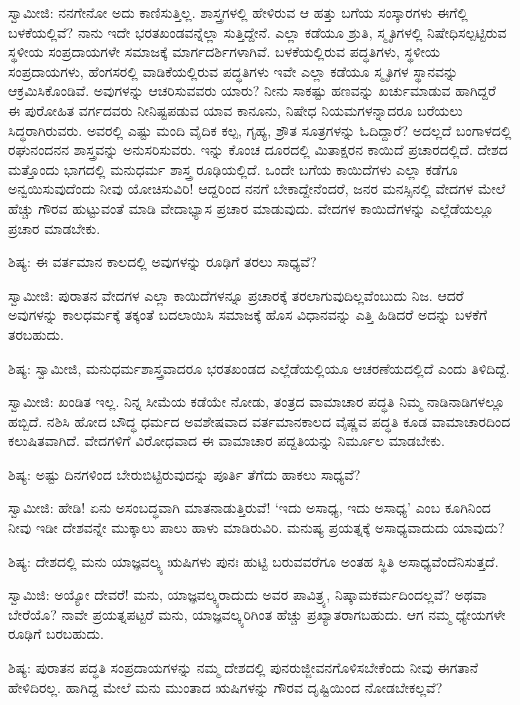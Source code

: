 ಸ್ವಾಮೀಜಿ: ನನಗೇನೋ ಅದು ಕಾಣಿಸುತ್ತಿಲ್ಲ. ಶಾಸ್ತ್ರಗಳಲ್ಲಿ ಹೇಳಿರುವ ಆ ಹತ್ತು ಬಗೆಯ ಸಂಸ್ಕಾರಗಳು ಈಗೆಲ್ಲಿ ಬಳಕೆಯಲ್ಲಿವೆ? ನಾನು ಇದೇ ಭರತಖಂಡವನ್ನೆಲ್ಲಾ ಸುತ್ತಿದ್ದೇನೆ. ಎಲ್ಲಾ ಕಡೆಯೂ ಶ್ರುತಿ, ಸ್ಮೃತಿಗಳಲ್ಲಿ ನಿಷೇಧಿಸಲ್ಪಟ್ಟಿರುವ ಸ್ಥಳೀಯ ಸಂಪ್ರದಾಯಗಳೇ ಸಮಾಜಕ್ಕೆ ಮಾರ್ಗದರ್ಶಿಗಳಾಗಿವೆ. ಬಳಕೆಯಲ್ಲಿರುವ ಪದ್ಧತಿಗಳು, ಸ್ಥಳೀಯ ಸಂಪ್ರದಾಯಗಳು, ಹೆಂಗಸರಲ್ಲಿ ವಾಡಿಕೆಯಲ್ಲಿರುವ ಪದ್ಧತಿಗಳು ಇವೇ ಎಲ್ಲಾ ಕಡೆಯೂ ಸ್ಮೃತಿಗಳ ಸ್ಥಾನವನ್ನು ಆಕ್ರಮಿಸಿಕೊಂಡಿವೆ. ಅವುಗಳನ್ನು ಆಚರಿಸುವವರು ಯಾರು? ನೀನು ಸಾಕಷ್ಟು ಹಣವನ್ನು ಖರ್ಚುಮಾಡುವ ಹಾಗಿದ್ದರೆ ಈ ಪುರೋಹಿತ ವರ್ಗದವರು ನೀನಿಷ್ಟಪಡುವ ಯಾವ ಕಾನೂನು, ನಿಷೇಧ ನಿಯಮಗಳನ್ನಾದರೂ ಬರೆಯಲು ಸಿದ್ಧರಾಗಿರುವರು. ಅವರಲ್ಲಿ ಎಷ್ಟು ಮಂದಿ ವೈದಿಕ ಕಲ್ಪ, ಗೃಹ್ಯ, ಶ್ರೌತ ಸೂತ್ರಗಳನ್ನು ಓದಿದ್ದಾರೆ? ಅದಲ್ಲದೆ ಬಂಗಾಳದಲ್ಲಿ ರಘುನಂದನನ ಶಾಸ್ತ್ರವನ್ನು ಅನುಸರಿಸುವರು. ಇನ್ನು ಕೊಂಚ ದೂರದಲ್ಲಿ ಮಿತಾಕ್ಷರನ ಕಾಯಿದೆ ಪ್ರಚಾರದಲ್ಲಿದೆ. ದೇಶದ ಮತ್ತೊಂದು ಭಾಗದಲ್ಲಿ ಮನುಧರ್ಮ ಶಾಸ್ತ್ರ ರೂಢಿಯಲ್ಲಿದೆ. ಒಂದೇ ಬಗೆಯ ಕಾಯಿದೆಗಳು ಎಲ್ಲಾ ಕಡೆಗೂ ಅನ್ವಯಿಸುವುದೆಂದು ನೀವು ಯೋಚಿಸುವಿರಿ! ಆದ್ದರಿಂದ ನನಗೆ ಬೇಕಾದ್ದೇನೆಂದರೆ, ಜನರ ಮನಸ್ಸಿನಲ್ಲಿ ವೇದಗಳ ಮೇಲೆ ಹೆಚ್ಚು ಗೌರವ ಹುಟ್ಟುವಂತೆ ಮಾಡಿ ವೇದಾಭ್ಯಾಸ ಪ್ರಚಾರ ಮಾಡುವುದು. ವೇದಗಳ ಕಾಯಿದೆಗಳನ್ನು ಎಲ್ಲೆಡೆಯಲ್ಲೂ ಪ್ರಚಾರ ಮಾಡಬೇಕು.

ಶಿಷ್ಯ: ಈ ವರ್ತಮಾನ ಕಾಲದಲ್ಲಿ ಅವುಗಳನ್ನು ರೂಢಿಗೆ ತರಲು ಸಾಧ್ಯವೆ?

ಸ್ವಾಮೀಜಿ: ಪುರಾತನ ವೇದಗಳ ಎಲ್ಲಾ ಕಾಯಿದೆಗಳನ್ನೂ ಪ್ರಚಾರಕ್ಕೆ ತರಲಾಗುವುದಿಲ್ಲವೆಂಬುದು ನಿಜ. ಆದರೆ ಅವುಗಳನ್ನು ಕಾಲಧರ್ಮಕ್ಕೆ ತಕ್ಕಂತೆ ಬದಲಾಯಿಸಿ ಸಮಾಜಕ್ಕೆ ಹೊಸ ವಿಧಾನವನ್ನು ಎತ್ತಿ ಹಿಡಿದರೆ ಅದನ್ನು ಬಳಕೆಗೆ ತರಬಹುದು.

ಶಿಷ್ಯ: ಸ್ವಾಮೀಜಿ, ಮನುಧರ್ಮಶಾಸ್ತ್ರವಾದರೂ ಭರತಖಂಡದ ಎಲ್ಲೆಡೆಯಲ್ಲಿಯೂ ಆಚರಣೆಯದಲ್ಲಿದೆ ಎಂದು ತಿಳಿದಿದ್ದೆ.

ಸ್ವಾಮೀಜಿ: ಖಂಡಿತ ಇಲ್ಲ. ನಿನ್ನ ಸೀಮೆಯ ಕಡೆಯೇ ನೋಡು, ತಂತ್ರದ ವಾಮಾಚಾರ ಪದ್ಧತಿ ನಿಮ್ಮ ನಾಡಿನಾಡಿಗಳಲ್ಲೂ ಹಬ್ಬಿದೆ. ನಶಿಸಿ ಹೋದ ಬೌದ್ಧ ಧರ್ಮದ ಅವಶೇಷವಾದ ವರ್ತಮಾನಕಾಲದ ವೈಷ್ಣವ ಪದ್ಧತಿ ಕೂಡ ವಾಮಾಚಾರದಿಂದ ಕಲುಷಿತವಾಗಿದೆ. ವೇದಗಳಿಗೆ ವಿರೋಧವಾದ ಈ ವಾಮಾಚಾರ ಪದ್ದತಿಯನ್ನು ನಿರ್ಮೂಲ ಮಾಡಬೇಕು.

ಶಿಷ್ಯ: ಅಷ್ಟು ದಿನಗಳಿಂದ ಬೇರುಬಿಟ್ಟಿರುವುದನ್ನು ಪೂರ್ತಿ ತೆಗೆದು ಹಾಕಲು ಸಾಧ್ಯವೆ?

ಸ್ವಾಮೀಜಿ: ಹೇಡಿ! ಏನು ಅಸಂಬದ್ಧವಾಗಿ ಮಾತನಾಡುತ್ತಿರುವೆ! ‘ಇದು ಅಸಾಧ್ಯ, ಇದು ಅಸಾಧ್ಯ’ ಎಂಬ ಕೂಗಿನಿಂದ ನೀವು ಇಡೀ ದೇಶವನ್ನೇ ಮುಕ್ಕಾಲು ಪಾಲು ಹಾಳು ಮಾಡಿರುವಿರಿ. ಮನುಷ್ಯ ಪ್ರಯತ್ನಕ್ಕೆ ಅಸಾಧ್ಯವಾದುದು ಯಾವುದು?

ಶಿಷ್ಯ: ದೇಶದಲ್ಲಿ ಮನು ಯಾಜ್ಞವಲ್ಕ್ಯ ಋಷಿಗಳು ಪುನಃ ಹುಟ್ಟಿ ಬರುವವರೆಗೂ ಅಂತಹ ಸ್ಥಿತಿ ಅಸಾಧ್ಯವೆಂದೆನಿಸುತ್ತದೆ.

ಸ್ವಾಮಿಜಿ: ಅಯ್ಯೋ ದೇವರೆ! ಮನು, ಯಾಜ್ಞವಲ್ಕ್ಯರಾದುದು ಅವರ ಪಾವಿತ್ರ್ಯ, ನಿಷ್ಕಾಮಕರ್ಮದಿಂದಲ್ಲವೆ? ಅಥವಾ ಬೇರೆಯೊ? ನಾವೇ ಪ್ರಯತ್ನಪಟ್ಟರೆ ಮನು, ಯಾಜ್ಞವಲ್ಕ್ಯರಿಗಿಂತ ಹೆಚ್ಚು ಪ್ರಖ್ಯಾತರಾಗಬಹುದು. ಆಗ ನಮ್ಮ ಧ್ಯೇಯಗಳೇ ರೂಢಿಗೆ ಬರಬಹುದು.

ಶಿಷ್ಯ: ಪುರಾತನ ಪದ್ಧತಿ ಸಂಪ್ರದಾಯಗಳನ್ನು ನಮ್ಮ ದೇಶದಲ್ಲಿ ಪುನರುಜ್ಜೀವನಗೊಳಿಸಬೇಕೆಂದು ನೀವು ಈಗತಾನೆ ಹೇಳಿದಿರಲ್ಲ. ಹಾಗಿದ್ದ ಮೇಲೆ ಮನು ಮುಂತಾದ ಋಷಿಗಳನ್ನು ಗೌರವ ದೃಷ್ಟಿಯಿಂದ ನೋಡಬೇಕಲ್ಲವೆ?

